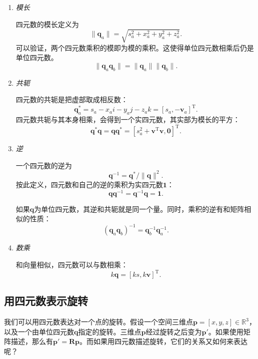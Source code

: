 \begin{enumerate}
	\item { \emph{模长} }
		
	四元数的模长定义为
	\begin{equation}
	\| \bm{q}_a \| = \sqrt{ s_a^2 + x_a^2 + y_a^2 + z_a^2 }.
	\end{equation}
	可以验证，两个四元数乘积的模即为模的乘积。这使得单位四元数相乘后仍是单位四元数。
	\begin{equation}
	\| \bm{q}_a \bm{q}_b \| = \|\bm{q}_a \| \| \bm{q}_b \|.
	\end{equation}
	
	\item { \emph{共轭} }
	
	四元数的共轭是把虚部取成相反数：
	\begin{equation}
	\bm{q}_a^* = s_a - x_ai - y_aj - z_ak = [s_a, -\bm{v}_a]^\mathrm{T}.
	\end{equation}
	四元数共轭与其本身相乘，会得到一个实四元数，其实部为模长的平方：
	\begin{equation}
	\bm{q}^* \bm{q} = \bm{q} \bm{q}^* = [s_a^2+\bm{v}^\mathrm{T} \bm{v}, \bm{0} ]^\mathrm{T}.
	\end{equation}

	\item{ \emph{逆} }
	
	一个四元数的逆为
	\begin{equation}
	\label{eq:quaternionInverse}
	\bm{q}^{-1} = \bm{q}^* / \| \bm{q} \| ^2.
	\end{equation}
	按此定义，四元数和自己的逆的乘积为实四元数$\bm{1}$：
	\begin{equation}
	\bm{q} \bm{q}^{-1} = \bm{q}^{-1} \bm{q} = \bm{1}.
	\end{equation}
	
	如果$\bm{q}$为单位四元数，其逆和共轭就是同一个量。同时，乘积的逆有和矩阵相似的性质：
	\begin{equation}
	\left( \bm{q}_a \bm{q}_b \right)^{-1} = \bm{q}_b^{-1} \bm{q}_a^{-1}.
	\end{equation}
	
	\item{ \emph{数乘} }
	
	和向量相似，四元数可以与数相乘：
	\begin{equation}
	k \bm{q} = \left[ ks, k\bm{v} \right]^\mathrm{T}.
	\end{equation}
\end{enumerate}

\subsection{用四元数表示旋转}
我们可以用四元数表达对一个点的旋转。假设一个空间三维点$\bm{p} = [x,y,z]\in \mathbb{R}^3$，以及一个由单位四元数$\bm{q}$指定的旋转。三维点$\bm{p}$经过旋转之后变为$\bm{p}'$。如果使用矩阵描述，那么有$\bm{p}'=\bm{R} \bm{p}$。而如果用四元数描述旋转，它们的关系又如何来表达呢？

